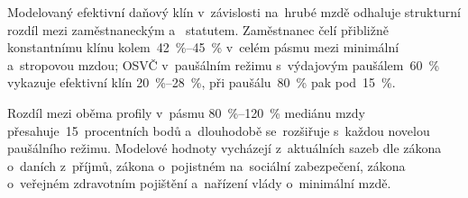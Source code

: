 Modelovaný efektivní daňový klín  v~závislosti na~hrubé mzdě odhaluje strukturní rozdíl mezi zaměstnaneckým a~ statutem. Zaměstnanec čelí přibližně konstantnímu klínu kolem~\SIrange{42}{45}{\percent} v~celém pásmu mezi minimální a~stropovou mzdou; \ac{OSVČ} v~paušálním režimu s~výdajovým paušálem~\SI{60}{\percent} vykazuje efektivní klín \SIrange{20}{28}{\percent}, při paušálu~\SI{80}{\percent} pak pod~\SI{15}{\percent}.

Rozdíl mezi oběma profily v~pásmu \SIrange{80}{120}{\percent} mediánu mzdy přesahuje~15~procentních bodů a~dlouhodobě se~rozšiřuje s~každou novelou paušálního režimu. Modelové hodnoty vycházejí z~aktuálních sazeb dle zákona o~daních z~příjmů, zákona o~pojistném na~sociální zabezpečení, zákona o~veřejném zdravotním pojištění a~nařízení vlády o~minimální mzdě.~\cite{zakon_zdp_1992}~\cite{zakon_sp_1992}~\cite{zakon_zp_1992}~\cite{nv_365_2025}


